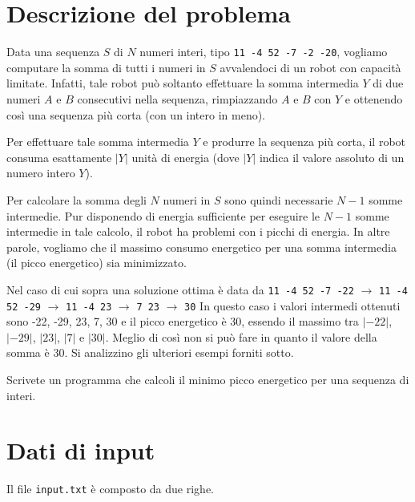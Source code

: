 \documentclass[a4paper,11pt]{article}
\begin{document}
\vspace{0.5cm}



\vspace{0.5cm}

\section*{Descrizione del problema}
  
Data una sequenza $S$ di $N$ numeri interi, tipo 
\texttt{11 -4 52 -7 -2 -20}, 
vogliamo computare la somma di tutti i numeri in $S$ avvalendoci di un
robot con capacità limitate. Infatti, tale robot può
soltanto effettuare la somma intermedia $Y$ di due numeri $A$ e $B$
consecutivi nella sequenza, rimpiazzando $A$ e $B$ con $Y$ e ottenendo
così una sequenza più corta (con un intero in meno).

Per effettuare tale somma intermedia $Y$ e produrre la sequenza
più corta, il robot consuma esattamente $|Y|$ unità di
energia (dove $|Y|$ indica il valore assoluto di un numero intero $Y$).

Per calcolare la somma degli $N$ numeri in $S$ sono quindi necessarie $N-1$
somme intermedie. Pur disponendo di energia sufficiente per eseguire
le $N-1$ somme intermedie in tale calcolo, il robot ha problemi con i
picchi di energia. In altre parole, vogliamo che il massimo consumo
energetico per una somma intermedia (il picco energetico) sia
minimizzato. 

Nel caso di cui sopra una soluzione ottima è data da
\texttt{11   -4  52   -7 -22} $\rightarrow$
\texttt{11   -4  52 -29} $\rightarrow$
\texttt{11   -4  23} $\rightarrow$
\texttt{7 23} $\rightarrow$ \texttt{30}
In questo caso i valori intermedi ottenuti sono -22, -29, 23, 7, 30 e
il picco energetico è $30$, essendo il massimo tra $|-22|$, $|-29|$,
$|23|$, $|7|$ e $|30|$. Meglio di così non si può fare in
quanto il valore della somma è $30$.
Si analizzino gli ulteriori esempi forniti sotto.

Scrivete un programma che calcoli il minimo picco energetico per una
sequenza di interi.


\section*{Dati di input}
  
Il file \texttt{input.txt} è composto da due righe.
\end{document}
